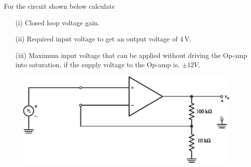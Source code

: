 \eject


\begin{example}\label{exam5.13}
For the circuit shown below calculate
\begin{itemize}
\item[(i)] Closed loop voltage gain.

\item[(ii)] Required input voltage to get an output voltage of 4\,V.

\item[(iii)] Maximum input voltage that can be applied without driving the Op-amp into saturation, if the supply voltage to the Op-amp is, $\pm 12V$.
\end{itemize}
\begin{figure}[H]
\centering
\includegraphics{chap4/S3-EE-06-IN008.eps}
\end{figure}
\end{example}

